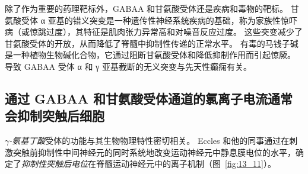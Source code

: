 除了作为重要的药理靶标外，GABAA 和甘氨酸受体还是疾病和毒物的靶标。
甘氨酸受体 α 亚基的错义突变是一种遗传性神经系统疾病的基础，称为家族性惊吓病（或惊跳过度），其特征是肌肉张力异常高和对噪音反应过度。
这些突变减少了甘氨酸受体的开放，从而降低了脊髓中抑制性传递的正常水平。
有毒的马钱子碱是一种植物生物碱化合物，它通过阻断甘氨酸受体和降低抑制作用而引起惊厥。
导致 GABAA 受体 α 和 γ 亚基截断的无义突变与先天性癫痫有关。



\subsection{通过 GABAA 和甘氨酸受体通道的氯离子电流通常会抑制突触后细胞}

\textit{$\gamma$-氨基丁酸}受体的功能与其生物物理特性密切相关。
Eccles 和他的同事通过在刺激突触前抑制性中间神经元的同时系统地改变运动神经元中静息膜电位的水平，确定了\textit{抑制性突触后电位}在脊髓运动神经元中的离子机制（图~\ref{fig:13_11}）。


